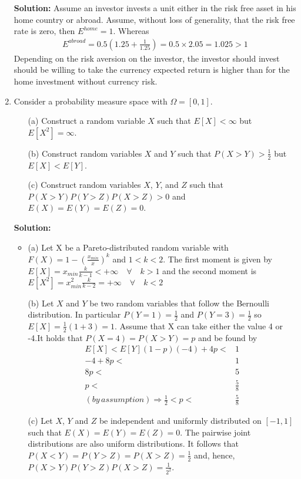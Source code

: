 \documentclass[letterpaper,12pt]{article}
\theoremstyle{definition}
\begin{document}
\begin{enumerate}
\textbf{Solution:}
Assume an investor invests a unit either in the risk free asset in his home country or abroad. Assume, without loss of generality, that the risk free rate is zero, then $E^{home} = 1$. Whereas \begin{align*}
E^{abroad}=0.5  (1.25 + \frac{1}{1.25} ) = 0.5 \times 2.05 = 1.025 > 1
\end{align*} Depending on the risk aversion on the investor, the investor should invest should be willing to take the currency expected return is higher than for the home investment without currency risk.

\item Consider a probability measure space with $\Omega = [0,1]$.
		\begin{itemize}
			\item[(a)] Construct a random variable $X$ such that $E[X] < \infty$ but $E[X^2] = \infty$.
			\item[(b)] Construct random variables $X$ and $Y$ such that $P(X>Y)>\frac{1}{2}$ but $E[X]<E[Y]$.
			\item[(c)] Construct random variables $X$, $Y$, and $Z$ such that\\ $P(X>Y) P(Y>Z) P(X>Z) > 0$ and 						$E(X)=E(Y)=E(Z)=0$.
		\end{itemize}
\textbf{Solution:}
\begin{itemize}
\item (a) Let X be a Pareto-distributed random variable with $F(X) = 1 -  \left( \frac{x_{min}}{x} \right)^k$ and $1<k<2$. The first moment is given by $E[X]= x_{min}\frac{k}{k-1} < +\infty \quad \forall \quad k>1$ and the second moment is $E[X^2] = x_{min}^2\frac{k}{k-2} = +\infty  \quad \forall \quad  k<2$
\item[(b)] Let $X$ and $Y$ be two random variables that follow the Bernoulli distribution. In particular $P(Y=1)=\frac{1}{2}$ and $P(Y=3)=\frac{1}{2}$ so $E[X]=\frac{1}{2}(1 + 3)=1$. Assume that X can take either the value 4 or -4.It holds that  $P(X=4)=P(X>Y)=p$ and  be found by
\begin{align*}
E[X]<E[Y]
(1-p)(-4)+4p <& 1\\
-4 + 8p <& 1\\
8p <& 5\\
p<&\frac{5}{8}\\
(by \, assumption)\Rightarrow \frac{1}{2}<p<&\frac{5}{8}
\end{align*}
\item[(c)] Let $X$, $Y$ and $Z$ be independent and uniformly distributed on $[-1,1]$ such that $E(X) = E(Y) = E(Z) =0$. The pairwise joint distributions are also uniform distributions. It follows that $P(X<Y)=P(Y>Z)=P(X>Z)=\frac{1}{2}$ and, hence, $P(X>Y) P(Y>Z) P(X>Z) =\frac{1}{2^2} $.

\end{itemize}
\end{enumerate}
\end{document}
